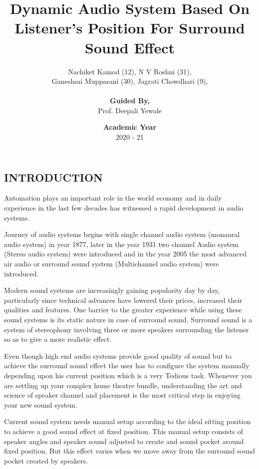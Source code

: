 \documentclass[twocolumn]{report}
\title{\textbf{Dynamic Audio System Based On Listener's Position For Surround Sound Effect}}
\author{Nachiket Kamod (12), N V Roshni (31),\\Ganeshsai Muppasani (30), Jagrati Chowdhari (9), \\\\\textbf{Guided By,}\\Prof. Deepali Yewale}
\date{\textbf{Academic Year}\\2020 - 21}
\begin{document}
\maketitle

\tableofcontents

\listoffigures

\chapter{}

\section{INTRODUCTION}

Automation plays an important role in the world 
economy and in daily experience in the last few 
decades has witnessed a rapid development in audio
systems.

Journey of audio systems begins with single channel 
audio system (monaural audio system) in year 1877, 
later in the year 1931 two channel Audio system 
(Stereo audio system) were introduced and in the year 
2005 the most advanced air audio or surround sound 
system (Multichannel audio system) were introduced.

Modern sound systems are increasingly gaining 
popularity day by day, particularly since technical 
advances have lowered their prices, increased their
qualities and features. One barrier to the greater 
experience while using these sound systems is its 
static nature in case of surround sound. Surround 
sound is a system of stereophony involving three or 
more speakers surrounding the listener so as to give a 
more realistic effect.

Even though high end audio systems provide good quality 
of sound but to achieve the surround sound effect the 
user has to configure the system manually depending 
upon his current position which is a very Tedious task.
Whenever you are settling up your complex home theatre 
bundle, understanding the art and science of speaker 
channel and placement is the most critical step in enjoying 
your new sound system.

Current sound system needs manual setup according to the 
ideal sitting position to achieve a good sound effect at 
fixed position. This manual setup consists of speaker angles 
and speaker sound adjusted to create and sound pocket around 
fixed position. But this effect varies when we move away
from the surround sound pocket created by speakers.
\end{document}
